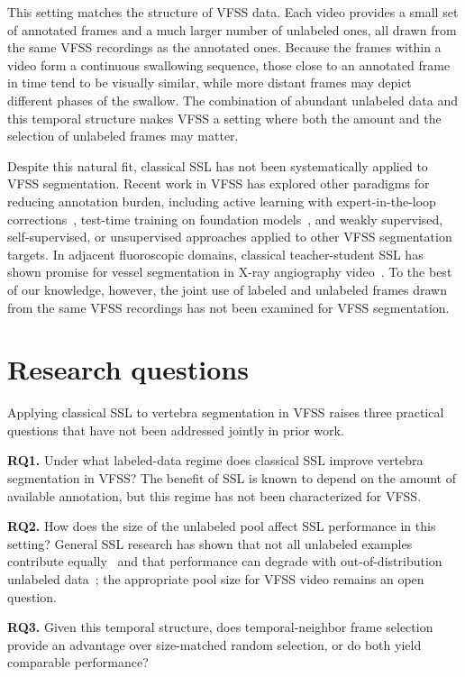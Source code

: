 \documentclass[
  msc,
  american
]{ThesisPUC_v2}
\begin{document}
This setting matches the structure of VFSS data. Each video provides a small set of annotated frames and a much larger number of unlabeled ones, all drawn from the same VFSS recordings as the annotated ones. Because the frames within a video form a continuous swallowing sequence, those close to an annotated frame in time tend to be visually similar, while more distant frames may depict different phases of the swallow. The combination of abundant unlabeled data and this temporal structure makes VFSS a setting where both the amount and the selection of unlabeled frames may matter.

Despite this natural fit, classical SSL has not been systematically applied to VFSS segmentation. Recent work in VFSS has explored other paradigms for reducing annotation burden, including active learning with expert-in-the-loop corrections~\citep{ref_cubero2025}, test-time training on foundation models~\citep{ref_zeng_ttt}, and weakly supervised, self-supervised, or unsupervised approaches applied to other VFSS segmentation targets. In adjacent fluoroscopic domains, classical teacher-student SSL has shown promise for vessel segmentation in X-ray angiography video~\citep{ref_luo_smart2026}. To the best of our knowledge, however, the joint use of labeled and unlabeled frames drawn from the same VFSS recordings has not been examined for VFSS segmentation.


\section{Research questions}
\label{sec:intro-rqs}

Applying classical SSL to vertebra segmentation in VFSS raises three practical questions that have not been addressed jointly in prior work.

\textbf{RQ1.} Under what labeled-data regime does classical SSL improve vertebra segmentation in VFSS? The benefit of SSL is known to depend on the amount of available annotation, but this regime has not been characterized for VFSS.

\textbf{RQ2.} How does the size of the unlabeled pool affect SSL performance in this setting? General SSL research has shown that not all unlabeled examples contribute equally~\citep{ref_ren2020} and that performance can degrade with out-of-distribution unlabeled data~\citep{ref_oliver2018}; the appropriate pool size for VFSS video remains an open question.

\textbf{RQ3.} Given this temporal structure, does temporal-neighbor frame selection provide an advantage over size-matched random selection, or do both yield comparable performance?
\end{document}
